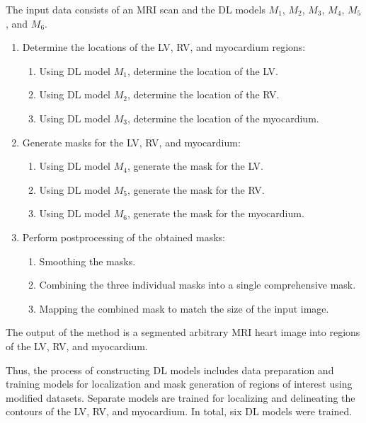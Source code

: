 \documentclass[fleqn,10pt]{wlscirep}
\begin{document}
The input data consists of an MRI scan and the DL models \({M_1}\), \({M_2}\), \({M_3}\), \({M_4}\), \({M_5}\), and \({M_6}\).

\begin{enumerate}[label=Step \arabic*:, leftmargin=5em]
    \item Determine the locations of the LV, RV, and myocardium regions:
    \begin{enumerate}[label=Step 1.\arabic*:, leftmargin=2.5em]
        \item Using DL model \({M_1}\), determine the location of the LV.
        \item Using DL model \({M_2}\), determine the location of the RV.
        \item Using DL model \({M_3}\), determine the location of the myocardium.
    \end{enumerate}
    \item Generate masks for the LV, RV, and myocardium:
    \begin{enumerate}[label=Step 2.\arabic*:, leftmargin=2.5em]
        \item Using DL model \({M_4}\), generate the mask for the LV.
        \item Using DL model \({M_5}\), generate the mask for the RV.
        \item Using DL model \({M_6}\), generate the mask for the myocardium.
    \end{enumerate}
    \item Perform postprocessing of the obtained masks:
    \begin{enumerate}[label=Step 3.\arabic*:, leftmargin=2.5em]
        \item Smoothing the masks.
        \item Combining the three individual masks into a single comprehensive mask.
        \item Mapping the combined mask to match the size of the input image.
    \end{enumerate}
\end{enumerate}

The output of the method is a segmented arbitrary MRI heart image into regions of the LV, RV, and myocardium.

Thus, the process of constructing DL models includes data preparation and training models for localization and mask generation of regions of interest using modified datasets. Separate models are trained for localizing and delineating the contours of the LV, RV, and myocardium. In total, six DL models were trained.
\end{document}
